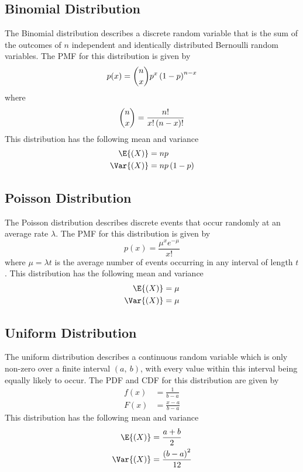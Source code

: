 \documentclass{article}
\begin{document}
\subsection{Binomial Distribution}
The Binomial distribution describes a discrete random variable that is the sum of the outcomes of \(n\)
independent and identically distributed Bernoulli random variables.
The PMF for this distribution is given by
\begin{equation*}
    p(x) = \dbinom{n}{x} p^x \left( 1 - p \right)^{n - x}
\end{equation*}
where
\begin{equation*}
    \dbinom{n}{x} = \frac{n!}{x!\left( n - x \right)!}
\end{equation*}
This distribution has the following mean and variance
\begin{align*}
    \E{\left( X \right)}   & = np                     \\
    \Var{\left( X \right)} & = np\left( 1 - p \right)
\end{align*}
\subsection{Poisson Distribution}
The Poisson distribution describes discrete events that occur randomly at an average rate \(\lambda \).
The PMF for this distribution is given by
\begin{equation*}
    p(x) = \frac{\mu^xe^{-\mu}}{x!}
\end{equation*}
where \(\mu = \lambda t\) is the average number of events occurring in any interval of length \(t\).
This distribution has the following mean and variance
\begin{align*}
    \E{\left( X \right)}   & = \mu \\
    \Var{\left( X \right)} & = \mu
\end{align*}
\subsection{Uniform Distribution}
The uniform distribution describes a continuous random variable which is only non-zero over a finite interval \(\left( a,\: b \right)\),
with every value within this interval being equally likely to occur. The PDF and CDF for this distribution are given by
\begin{align*}
    f(x) & = \frac{1}{b - a}     \\
    F(x) & = \frac{x - a}{b - a}
\end{align*}
This distribution has the following mean and variance
\begin{align*}
    \E{\left( X \right)}   & = \frac{a + b}{2}                   \\
    \Var{\left( X \right)} & = \frac{\left( b - a \right)^2}{12}
\end{align*}
\end{document}
